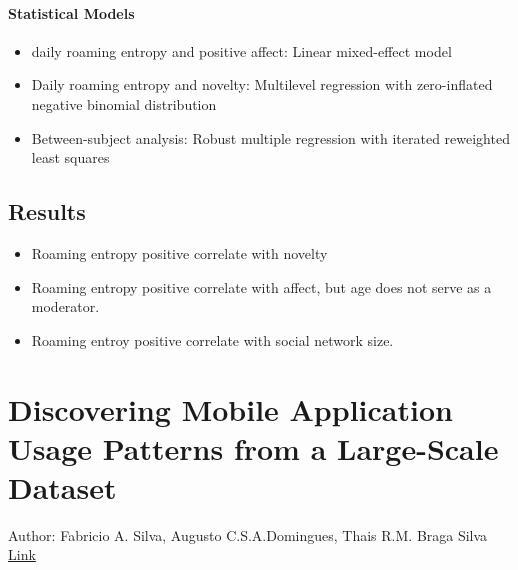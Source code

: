 \paragraph{Statistical Models} 
    \begin{itemize}
        \item daily roaming entropy and positive affect:  Linear mixed-effect model
        \item Daily roaming entropy and novelty: Multilevel regression with zero-inflated negative binomial distribution 
        \item Between-subject analysis: Robust multiple regression with iterated reweighted least squares
    \end{itemize}
    
\subsection{Results}
    \begin{itemize}
        \item Roaming entropy positive correlate with novelty 
        \item Roaming entropy positive correlate with affect, but age does not serve as a moderator. 
        \item Roaming entroy positive correlate with social network size. 
    \end{itemize}
    
    


    
\newpage 
\section{Discovering Mobile Application Usage Patterns from a Large-Scale Dataset} 

Author: Fabricio A. Silva, Augusto C.S.A.Domingues, Thais R.M. Braga Silva
\href{https://dl.acm.org/doi/abs/10.1145/3209669}{Link}

